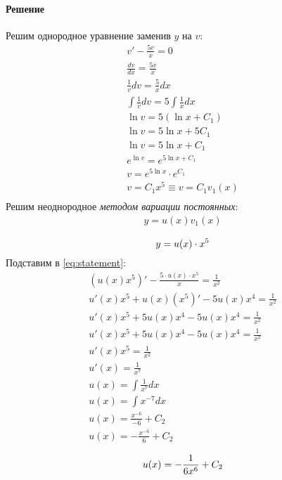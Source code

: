 \paragraph{Решение}
Решим однородное уравнение заменив $y$ на $v$:
\begin{gather*}
	v' - \frac{5v}{x} = 0 \\
	\frac{dv}{dx} = \frac{5v}{x} \\
	\frac{1}{v}dv = \frac{5}{x}dx \\
	\int\frac{1}{v}dv = 5\int\frac{1}{x}dx \\
	\ln{v} = 5(\ln{x} + C_1) \\
	\ln{v} = 5\ln{x} + 5C_1 \\
	\ln{v} = 5\ln{x} + C_1 \\
	e^{\ln{v}} = e^{5\ln{x} + C_1} \\
	v = e^{5\ln{x}} \cdot e^{C_1} \\
	v = C_1x^5 \equiv v = C_1v_1(x) \\
\end{gather*}
Решим неоднородное \textit{методом вариации постоянных}:
\begin{gather*}
	y = u(x)v_1(x) \\
\end{gather*}
\begin{equation} \label{eq:variation_method}
	y = u(x) \cdot x^5 \\
\end{equation}
Подставим в \ref{eq:statement}:
\begin{gather*}
	(u(x) x^5)' - \frac{5 \cdot u(x) \cdot x^5}{x} = \frac{1}{x^2} \\
	u'(x) x^5 + u(x)(x^5)' - 5u(x) x^4 = \frac{1}{x^2} \\
	u'(x) x^5 + 5u(x)x^4 - 5u(x) x^4 = \frac{1}{x^2} \\
	u'(x) x^5 + 5u(x)x^4 - 5u(x) x^4 = \frac{1}{x^2} \\
	u'(x) x^5 = \frac{1}{x^2} \\
	u'(x)  = \frac{1}{x^7} \\
	u(x)  = \int\frac{1}{x^7}dx \\
	u(x)  = \int x^{-7}dx \\
	u(x)  = \frac{x^{-6}}{-6} + C_2 \\
	u(x)  = -\frac{x^{-6}}{6} + C_2 \\
\end{gather*}
\begin{equation} \label{eq:found_u}
	u(x)  = -\frac{1}{6x^6} + C_2 \\
\end{equation}
